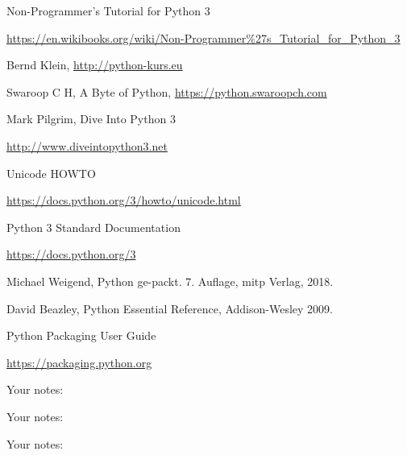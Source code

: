 \documentclass[9pt,a4wide]{extarticle}
\begin{document}
\begin{thebibliography}{zzzz}

 Non-Programmer's Tutorial for Python 3

   \url{https://en.wikibooks.org/wiki/Non-Programmer%27s_Tutorial_for_Python_3}

 Bernd Klein, \url{http://python-kurs.eu}

 Swaroop C H, A Byte of Python, \url{https://python.swaroopch.com}

 Mark Pilgrim, Dive Into Python 3

    \url{http://www.diveintopython3.net}

 Unicode HOWTO

    \url{https://docs.python.org/3/howto/unicode.html}

 Python 3 Standard Documentation

    \url{https://docs.python.org/3}

 Michael Weigend, Python ge-packt. 7. Auflage, mitp Verlag, 2018.

 David Beazley, Python Essential Reference, Addison-Wesley 2009.

 Python Packaging User Guide

    \url{https://packaging.python.org}

\end{thebibliography}


\newpage

Your notes:

\newpage

Your notes:

\newpage

Your notes:


\end{document}
